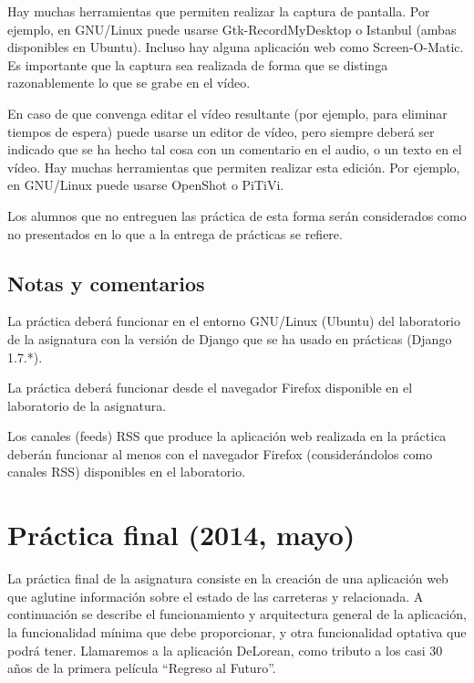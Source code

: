 Hay muchas herramientas que permiten realizar la captura de pantalla. Por ejemplo, en GNU/Linux puede usarse Gtk-RecordMyDesktop o Istanbul (ambas disponibles en Ubuntu). Incluso hay alguna aplicación web como Screen-O-Matic. Es importante que la captura sea realizada de forma que se distinga razonablemente lo que se grabe en el vídeo.

En caso de que convenga editar el vídeo resultante (por ejemplo, para eliminar tiempos de espera) puede usarse un editor de vídeo, pero siempre deberá ser indicado que se ha hecho tal cosa con un comentario en el audio, o un texto en el vídeo. Hay muchas herramientas que permiten realizar esta edición. Por ejemplo, en GNU/Linux puede usarse OpenShot o PiTiVi.

Los alumnos que no entreguen las práctica de esta forma serán considerados como no presentados en lo que a la entrega de prácticas se refiere.

\subsection{Notas y comentarios}

La práctica deberá funcionar en el entorno GNU/Linux (Ubuntu) del laboratorio de la asignatura con la versión de Django que se ha usado en prácticas (Django 1.7.*).

La práctica deberá funcionar desde el navegador Firefox disponible en el laboratorio de la asignatura.

Los canales (feeds) RSS que produce la aplicación web realizada en la práctica deberán funcionar al menos con el navegador Firefox (considerándolos como canales RSS) disponibles en el laboratorio.


\newpage

\section{Práctica final (2014, mayo)}
\label{practica-final-2014-04}

La práctica final de la asignatura consiste en la creación de una aplicación web que aglutine información sobre el estado de las carreteras y relacionada. A continuación se describe el funcionamiento y arquitectura general de la aplicación, la funcionalidad mínima que debe proporcionar, y otra funcionalidad optativa que podrá tener. Llamaremos a la aplicación DeLorean, como tributo a los casi 30 años de la primera película ``Regreso al Futuro''.

